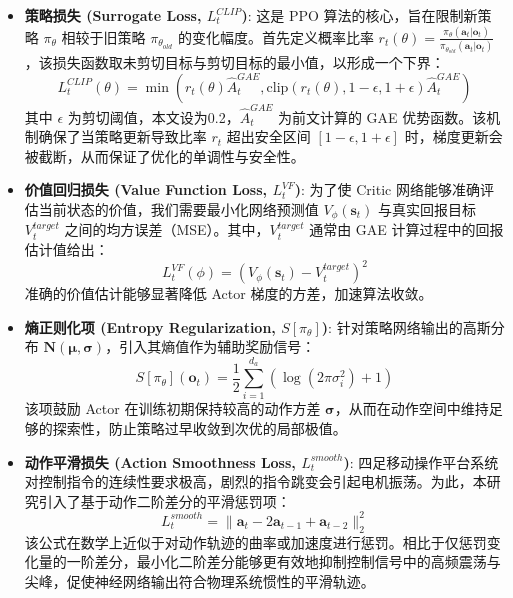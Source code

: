 \begin{itemize}
    \item \textbf{策略损失 (Surrogate Loss, $L_t^{CLIP}$)}:
          这是 PPO 算法的核心，旨在限制新策略 $\pi_\theta$ 相较于旧策略 $\pi_{\theta_{old}}$ 的变化幅度。首先定义概率比率 $r_t(\theta) = \frac{\pi_\theta(\mathbf{a}_t|\mathbf{o}_t)}{\pi_{\theta_{old}}(\mathbf{a}_t|\mathbf{o}_t)}$，该损失函数取未剪切目标与剪切目标的最小值，以形成一个下界：
          \begin{equation}
              L_t^{CLIP}(\theta) = \min \left( r_t(\theta) \hat{A}^{GAE}_t, \text{clip}(r_t(\theta), 1-\epsilon, 1+\epsilon) \hat{A}^{GAE}_t \right)
          \end{equation}
          其中 $\epsilon$ 为剪切阈值，本文设为0.2，$\hat{A}^{GAE}_t$ 为前文计算的 GAE 优势函数。该机制确保了当策略更新导致比率 $r_t$ 超出安全区间 $[1-\epsilon, 1+\epsilon]$ 时，梯度更新会被截断，从而保证了优化的单调性与安全性。

    \item \textbf{价值回归损失 (Value Function Loss, $L_t^{VF}$)}:
          为了使 Critic 网络能够准确评估当前状态的价值，我们需要最小化网络预测值 $V_\phi(\mathbf{s}_t)$ 与真实回报目标 $V_t^{target}$ 之间的均方误差（MSE）。其中，$V_t^{target}$ 通常由 GAE 计算过程中的回报估计值给出：
          \begin{equation}
              L_t^{VF}(\phi) = \left( V_\phi(\mathbf{s}_t) - V_t^{target} \right)^2
          \end{equation}
          准确的价值估计能够显著降低 Actor 梯度的方差，加速算法收敛。

    \item \textbf{熵正则化项 (Entropy Regularization, $S[\pi_\theta]$)}:
          针对策略网络输出的高斯分布 $\mathbf{N}(\boldsymbol{\mu}, \boldsymbol{\sigma})$，引入其熵值作为辅助奖励信号：
          \begin{equation}
              S[\pi_\theta](\mathbf{o}_t) = \frac{1}{2} \sum_{i=1}^{d_a} \left( \log(2\pi \sigma_i^2) + 1 \right)
          \end{equation}
          该项鼓励 Actor 在训练初期保持较高的动作方差 $\boldsymbol{\sigma}$，从而在动作空间中维持足够的探索性，防止策略过早收敛到次优的局部极值。

    \item \textbf{动作平滑损失 (Action Smoothness Loss, $L_t^{smooth}$)}:
          四足移动操作平台系统对控制指令的连续性要求极高，剧烈的指令跳变会引起电机振荡。为此，本研究引入了基于动作二阶差分的平滑惩罚项：
          \begin{equation}
              L_t^{smooth} = \lVert \mathbf{a}_t - 2\mathbf{a}_{t-1} + \mathbf{a}_{t-2} \rVert_2^2
          \end{equation}
          该公式在数学上近似于对动作轨迹的曲率或加速度进行惩罚。相比于仅惩罚变化量的一阶差分，最小化二阶差分能够更有效地抑制控制信号中的高频震荡与尖峰，促使神经网络输出符合物理系统惯性的平滑轨迹。
\end{itemize}

